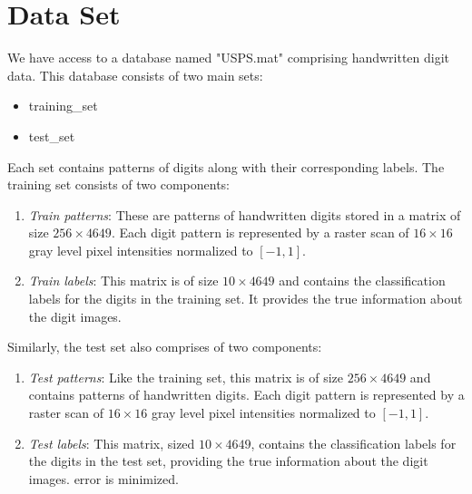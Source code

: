 \documentclass{article} %
\begin{document}
  \section{Data Set}
    \label{SECT:SECTION 2}
    We have access to a database named "USPS.mat" comprising handwritten digit data. This database consists of two main sets:
    \begin{itemize}
        \item training\_set
        \item test\_set
    \end{itemize}
    Each set contains patterns of digits along with their corresponding labels. 
    \noindent The training set consists of two components: 
    \begin{enumerate}
        \item \emph{Train patterns}: These are patterns of handwritten digits stored in a matrix of size $256 \times 4649$. Each digit pattern is represented by a raster scan of $16 \times 16$ gray level pixel intensities normalized to $[-1,1]$.
        \item \emph{Train labels}: This matrix is of size $10 \times 4649$ and contains the classification labels for the digits in the training set. It provides the true information about the digit images.
    \end{enumerate}
    Similarly, the test set also comprises of two components:
    \begin{enumerate}
        \item \emph{Test patterns}: Like the training set, this matrix is of size $256 \times 4649$ and contains patterns of handwritten digits. Each digit pattern is represented by a raster scan of $16 \times 16$ gray level pixel intensities normalized to $[-1,1]$.
        \item \emph{Test labels}: This matrix, sized $10 \times 4649$, contains the classification labels for the digits in the test set, providing the true information about the digit images. error is minimized.
    \end{enumerate}
\end{document}
